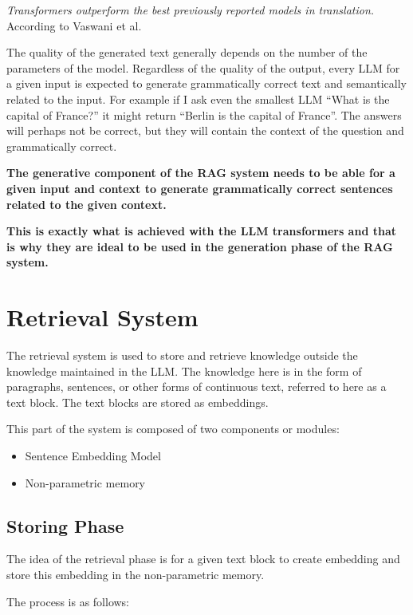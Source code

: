 \documentclass{wseas}
\begin{document}
\emph{Transformers outperform the best previously reported models in
translation.} According to Vaswani et al.~\cite{cite1}

The quality of the generated text generally depends on the number of the
parameters of the model. Regardless of the quality of the output, every
LLM for a given input is expected to generate grammatically correct text
and semantically related to the input. For example if I ask even the
smallest LLM ``What is the capital of France?'' it might return ``Berlin
is the capital of France''. The answers will perhaps not be correct, but
they will contain the context of the question and grammatically correct.

\break
\textbf{The generative component of the RAG system needs to be able for
a given input and context to generate grammatically correct sentences
related to the given context.}

\break
\textbf{This is exactly what is achieved with the LLM transformers and
that is why they are ideal to be used in the generation phase of the RAG
system.}
\break

\section{Retrieval System}

The retrieval system is used to store and retrieve knowledge outside the
knowledge maintained in the LLM. The knowledge here is in the form of
paragraphs, sentences, or other forms of continuous text, referred to
here as a text block. The text blocks are stored as embeddings.

This part of the system is composed of two components or modules:

\begin{itemize}

\item
  Sentence Embedding Model
\item
  Non-parametric memory
\end{itemize}

\subsection{Storing Phase}

The idea of the retrieval phase is for a given text block to create
embedding and store this embedding in the non-parametric memory.

The process is as follows:
\end{document}
